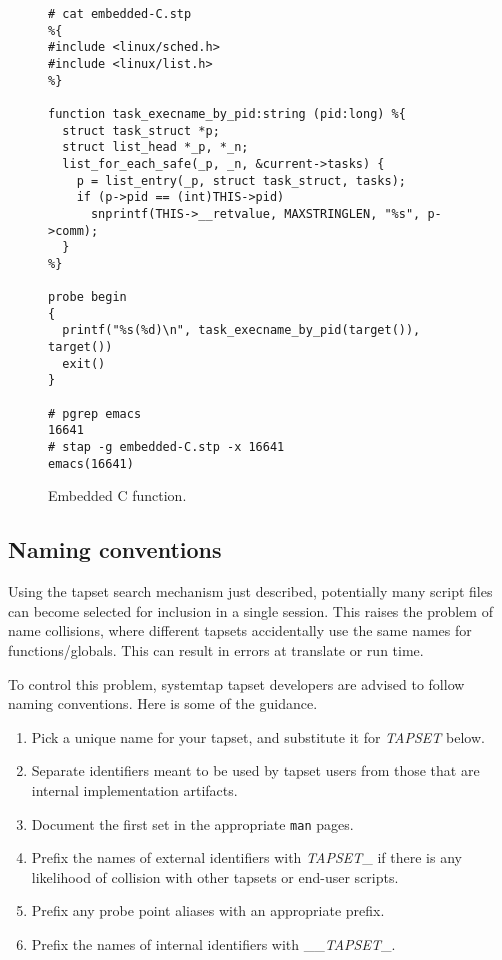 \documentclass{article}
\newenvironment{boxedminipage}%
    {\begin{makeimage}\begin{center}\begin{Sbox}\begin{minipage}}%
    {\end{minipage}\end{Sbox}\fbox{\TheSbox}\end{center}\end{makeimage}}
\renewcommand{\nomenclature}[2]{}
\begin{document}
\begin{figure}[!ht]
\begin{boxedminipage}{4.5in}
\begin{verbatim}
# cat embedded-C.stp
%{
#include <linux/sched.h>
#include <linux/list.h>
%}

function task_execname_by_pid:string (pid:long) %{
  struct task_struct *p;
  struct list_head *_p, *_n;
  list_for_each_safe(_p, _n, &current->tasks) {
    p = list_entry(_p, struct task_struct, tasks);
    if (p->pid == (int)THIS->pid) 
      snprintf(THIS->__retvalue, MAXSTRINGLEN, "%s", p->comm);
  }
%}

probe begin
{
  printf("%s(%d)\n", task_execname_by_pid(target()), target())
  exit()
}

# pgrep emacs
16641
# stap -g embedded-C.stp -x 16641
emacs(16641)
\end{verbatim}
\end{boxedminipage}
\caption{Embedded C function.}
\label{fig:embedded-C}
\end{figure}

\subsection{Naming conventions}

Using the tapset search mechanism just described, potentially many
script files can become selected for inclusion in a single session.
This raises the problem of name collisions, where different tapsets
accidentally use the same names for functions/globals.  This can
result in errors at translate or run time.

To control this problem, systemtap tapset developers are advised to
follow naming conventions.  Here is some of the guidance.
\nomenclature{naming convention}{Guidelines for naming variables and
functions to prevent unintentional duplication.}
\begin{enumerate}
\item Pick a unique name for your tapset, and substitute it for
{\em TAPSET} below.
\item Separate identifiers meant to be used by tapset users from
those that are internal implementation artifacts.
\item Document the first set in the appropriate \verb+man+ pages.
\item Prefix the names of external identifiers with {\em TAPSET}\_ if
there is any likelihood of collision with other tapsets or end-user
scripts.
\item Prefix any probe point aliases with an appropriate prefix.
\item Prefix the names of internal identifiers with \_\_{\em TAPSET}\_.
\end{enumerate}
\end{document}
